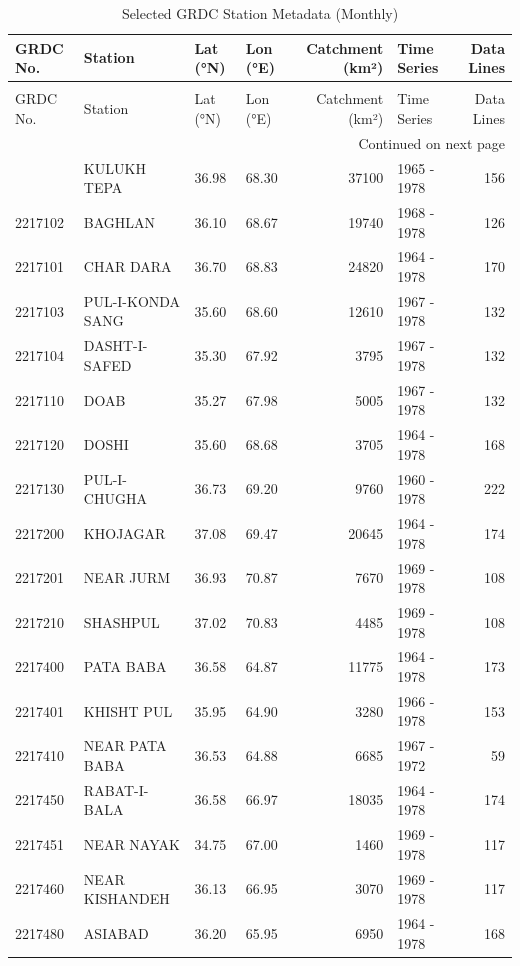 \begin{longtable}{lp{4.3cm}llrlr}
\caption{Selected GRDC Station Metadata (Monthly)} \label{tab:grdc_selected_metadata_monthly} \\
\toprule
GRDC No. & Station & Lat (°N) & Lon (°E) & Catchment (km²) & Time Series & Data Lines \\
\midrule
\endfirsthead
\caption[]{Selected GRDC Station Metadata (Monthly)} \\
\toprule
GRDC No. & Station & Lat (°N) & Lon (°E) & Catchment (km²) & Time Series & Data Lines \\
\midrule
\endhead
\midrule
\multicolumn{7}{r}{Continued on next page} \\
\midrule
\endfoot
\bottomrule
\endlastfoot
2217100 & KULUKH TEPA & 36.98 & 68.30 & 37100 & 1965 - 1978 & 156 \\
2217102 & BAGHLAN & 36.10 & 68.67 & 19740 & 1968 - 1978 & 126 \\
2217101 & CHAR DARA & 36.70 & 68.83 & 24820 & 1964 - 1978 & 170 \\
2217103 & PUL-I-KONDA SANG & 35.60 & 68.60 & 12610 & 1967 - 1978 & 132 \\
2217104 & DASHT-I-SAFED & 35.30 & 67.92 & 3795 & 1967 - 1978 & 132 \\
2217110 & DOAB & 35.27 & 67.98 & 5005 & 1967 - 1978 & 132 \\
2217120 & DOSHI & 35.60 & 68.68 & 3705 & 1964 - 1978 & 168 \\
2217130 & PUL-I-CHUGHA & 36.73 & 69.20 & 9760 & 1960 - 1978 & 222 \\
2217200 & KHOJAGAR & 37.08 & 69.47 & 20645 & 1964 - 1978 & 174 \\
2217201 & NEAR JURM & 36.93 & 70.87 & 7670 & 1969 - 1978 & 108 \\
2217210 & SHASHPUL & 37.02 & 70.83 & 4485 & 1969 - 1978 & 108 \\
2217400 & PATA BABA & 36.58 & 64.87 & 11775 & 1964 - 1978 & 173 \\
2217401 & KHISHT PUL & 35.95 & 64.90 & 3280 & 1966 - 1978 & 153 \\
2217410 & NEAR PATA BABA & 36.53 & 64.88 & 6685 & 1967 - 1972 & 59 \\
2217450 & RABAT-I-BALA & 36.58 & 66.97 & 18035 & 1964 - 1978 & 174 \\
2217451 & NEAR NAYAK & 34.75 & 67.00 & 1460 & 1969 - 1978 & 117 \\
2217460 & NEAR KISHANDEH & 36.13 & 66.95 & 3070 & 1969 - 1978 & 117 \\
2217480 & ASIABAD & 36.20 & 65.95 & 6950 & 1964 - 1978 & 168 \\

\end{longtable}
